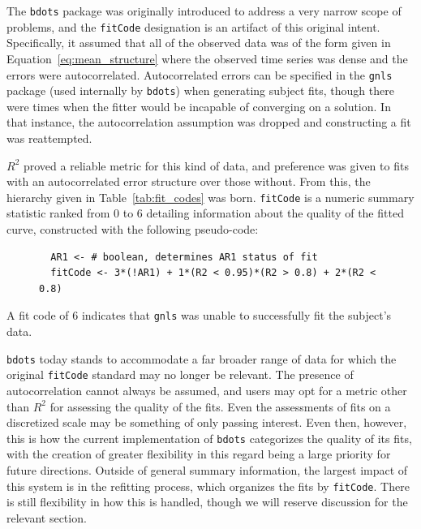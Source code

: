 \documentclass{article}
\newcommand{\xt}{\texttt}%
\begin{document}
The \xt{bdots} package was originally introduced to address a very narrow scope of problems, and the \xt{fitCode} designation is an artifact of this original intent. Specifically, it assumed that all of the observed data was of the form given in Equation~\ref{eq:mean_structure} where the observed time series was dense and the errors were autocorrelated. Autocorrelated errors can be specified in the \xt{gnls} package (used internally by \xt{bdots}) when generating subject fits, though there were times when the fitter would be incapable of converging on  a solution. In that instance, the autocorrelation assumption was dropped and constructing a fit was reattempted.

$R^2$ proved a reliable metric for this kind of data, and preference was given to fits with an autocorrelated error structure over those without. From this, the hierarchy given in Table~\ref{tab:fit_codes} was born. \xt{fitCode} is a numeric summary statistic ranked from 0 to 6 detailing information about the quality of the fitted curve, constructed with the following pseudo-code:

\begin{singlespace}
\begin{figure}[H]
\centering
\begin{BVerbatim}
  AR1 <- # boolean, determines AR1 status of fit
  fitCode <- 3*(!AR1) + 1*(R2 < 0.95)*(R2 > 0.8) + 2*(R2 < 0.8)
\end{BVerbatim}
\end{figure}
\end{singlespace}

A fit code of 6 indicates that \xt{gnls} was unable to successfully fit the 
subject's data. 

\xt{bdots} today stands to accommodate a far broader range of data for which the original \xt{fitCode} standard may no longer be relevant. The presence of autocorrelation cannot always be assumed, and users may opt for a metric other than $R^2$ for assessing the quality of the fits. Even the assessments of fits on a discretized scale may be something of only passing interest. Even then, however, this is how the current implementation of \xt{bdots} categorizes the quality of its fits, with the creation of greater flexibility in this regard being a large priority for future directions. Outside of general summary information, the largest impact of this system is in the refitting process, which organizes the fits by \xt{fitCode}. There is still flexibility in how this is handled, though we will reserve discussion for the relevant section. 
\end{document}
